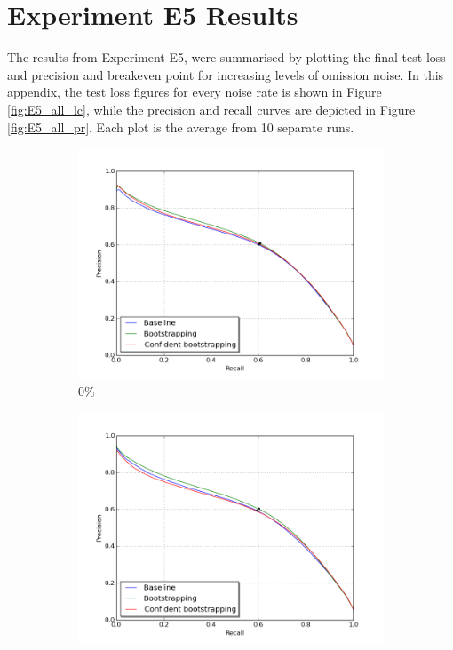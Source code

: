 \section{Experiment E5 Results}
The results from Experiment E5, were summarised by plotting the final test loss and precision and breakeven point for increasing levels of omission noise. In this appendix, the test loss figures for every noise rate is shown in Figure \ref{fig:E5_all_lc}, while the precision and recall curves are depicted in Figure \ref{fig:E5_all_pr}. Each plot is the average from 10 separate runs.\\
\label{app:fullE3results}
\begin{figure}[H]
\begin{subfigure}{0.31\textwidth}
\includegraphics[width=\textwidth]{figs/E5/pr_0.png}
\caption{ 0\% } \label{fig:app_E5_0_pr}
\vspace{0.2cm} %
\end{subfigure}
\hspace*{\fill} %
\begin{subfigure}{0.31\textwidth}
\includegraphics[width=\textwidth]{figs/E5/pr_1.png}

\end{subfigure}
\end{figure}
